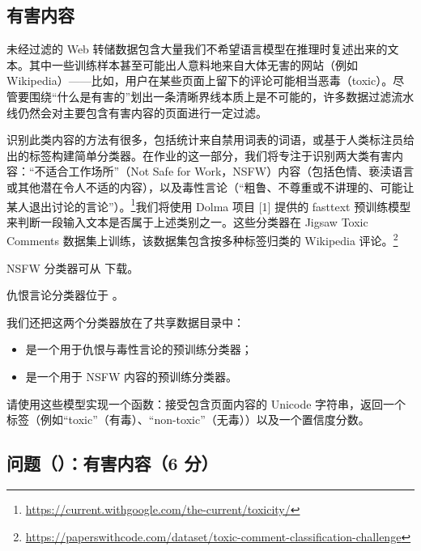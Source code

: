 \subsection{有害内容}

未经过滤的 Web 转储数据包含大量我们不希望语言模型在推理时复述出来的文本。其中一些训练样本甚至可能出人意料地来自大体无害的网站（例如 Wikipedia）——比如，用户在某些页面上留下的评论可能相当恶毒（toxic）。尽管要围绕“什么是有害的”划出一条清晰界线本质上是不可能的，许多数据过滤流水线仍然会对主要包含有害内容的页面进行一定过滤。

识别此类内容的方法有很多，包括统计来自禁用词表的词语，或基于人类标注员给出的标签构建简单分类器。在作业的这一部分，我们将专注于识别两大类有害内容：“不适合工作场所”（Not Safe for Work，NSFW）内容（包括色情、亵渎语言或其他潜在令人不适的内容），以及毒性言论（“粗鲁、不尊重或不讲理的、可能让某人退出讨论的言论”）。\footnote{\url{https://current.withgoogle.com/the-current/toxicity/}}我们将使用 Dolma 项目 [1] 提供的 fasttext 预训练模型来判断一段输入文本是否属于上述类别之一。这些分类器在 Jigsaw Toxic Comments 数据集上训练，该数据集包含按多种标签归类的 Wikipedia 评论。\footnote{\url{https://paperswithcode.com/dataset/toxic-comment-classification-challenge}}

NSFW 分类器可从  下载。

仇恨言论分类器位于 。

我们还把这两个分类器放在了共享数据目录中：
\begin{itemize}
  \item {} 是一个用于仇恨与毒性言论的预训练分类器；
  \item {} 是一个用于 NSFW 内容的预训练分类器。
\end{itemize}

请使用这些模型实现一个函数：接受包含页面内容的 Unicode 字符串，返回一个标签（例如“toxic”（有毒）、“non-toxic”（无毒））以及一个置信度分数。

\subsection*{问题（）：有害内容（6 分）}

